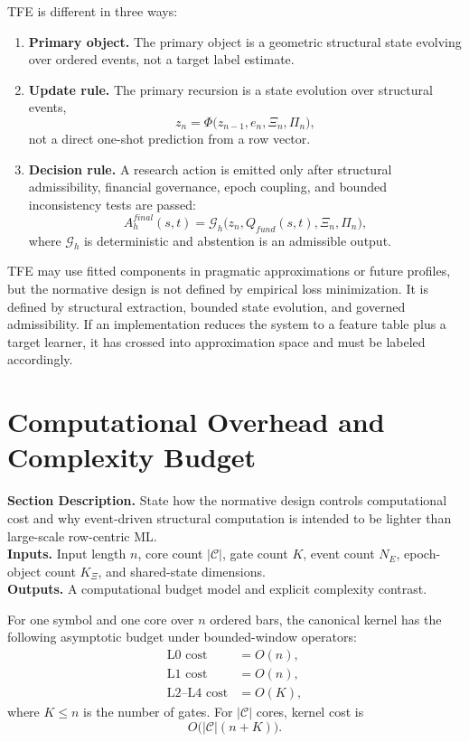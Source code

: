 \documentclass[11pt]{report}
\newcommand{\meta}[3]{\textbf{Section Description.} #1\\
\textbf{Inputs.} #2\\
\textbf{Outputs.} #3\par}
\begin{document}
TFE is different in three ways:
\begin{enumerate}[leftmargin=1.2cm]
    \item \textbf{Primary object.} The primary object is a geometric structural state evolving over ordered events, not a target label estimate.
    \item \textbf{Update rule.} The primary recursion is a state evolution over structural events,
    \[
    z_n = \Phi\big(z_{n-1}, e_n, \Xi_n, \Pi_n\big),
    \]
    not a direct one-shot prediction from a row vector.
    \item \textbf{Decision rule.} A research action is emitted only after structural admissibility, financial governance, epoch coupling, and bounded inconsistency tests are passed:
    \[
    A_h^{final}(s,t)=\mathcal{G}_h\big(z_n,Q_{fund}(s,t),\Xi_n,\Pi_n\big),
    \]
    where $\mathcal{G}_h$ is deterministic and abstention is an admissible output.
\end{enumerate}

TFE may use fitted components in pragmatic approximations or future profiles, but the normative design is not defined by empirical loss minimization. It is defined by structural extraction, bounded state evolution, and governed admissibility. If an implementation reduces the system to a feature table plus a target learner, it has crossed into approximation space and must be labeled accordingly.

\section{Computational Overhead and Complexity Budget}
\meta{State how the normative design controls computational cost and why event-driven structural computation is intended to be lighter than large-scale row-centric ML.}{Input length $n$, core count $|\mathcal{C}|$, gate count $K$, event count $N_E$, epoch-object count $K_{\Xi}$, and shared-state dimensions.}{A computational budget model and explicit complexity contrast.}

For one symbol and one core over $n$ ordered bars, the canonical kernel has the following asymptotic budget under bounded-window operators:
\begin{align*}
\text{L0 cost} &= O(n),\\
\text{L1 cost} &= O(n),\\
\text{L2--L4 cost} &= O(K),
\end{align*}
where $K\le n$ is the number of gates. For $|\mathcal{C}|$ cores, kernel cost is
\[
O\big(|\mathcal{C}|(n+K)\big).
\]
\end{document}

